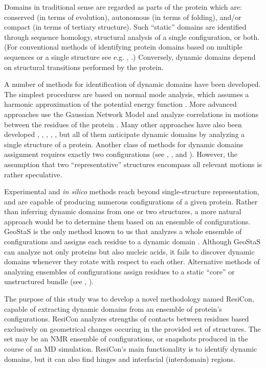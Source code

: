 Domains in traditional sense are regarded as parts of the protein which are: conserved (in terms of evolution), autonomous (in terms of folding), and/or compact (in terms of tertiary structure).
Such ``static'' domains are identified through sequence homology, structural analysis of a single configuration, or both.
(For conventional methods of identifying protein domains based on multiple sequences or a single structure see e.g. \cite{richardson1981anatomy}, \cite{bork1991shuffled}.)
Conversely, dynamic domains depend on structural transitions performed by the protein.

A number of methods for identification of dynamic domains have been developed.
The simplest procedures are based on normal mode analysis, which assumes a harmonic approximation of the potential energy function \cite{hinsen1998analysis}.
More advanced approaches use the Gaussian Network Model and analyze correlations in motions between the residues of the protein \cite{yesylevskyy2006dynamic}.
Many other approaches have also been developed \cite{bahar1997direct}, \cite{wriggers1997protein}, \cite{bernhard2010optimal}, \cite{genoni2012identification}, \cite{potestio2009coarse}, but all of them anticipate dynamic domains by analyzing a single structure of a protein.
Another class of methods for dynamic domains assignment requires exactly two configurations (see \cite{hayward1998systematic}, \cite{lee2003dyndom}, and \cite{ye2003flexible}).
However, the assumption that two ``representative'' structures encompass all relevant motions is rather speculative.

Experimental and \emph{in silico} methods reach beyond single-structure representation, and are capable of producing numerous configurations of a given protein.
Rather than inferring dynamic domains from one or two structures, a more natural approach would be to determine them based on an ensemble of configurations.
GeoStaS is the only method known to us that analyzes a whole ensemble of configurations and assigns each residue to a dynamic domain \cite{romanowska2012determining}.
Although GeoStaS can analyze not only proteins but also nucleic acids, it fails to discover dynamic domains whenever they rotate with respect to each other.
Alternative methods of analyzing ensembles of configurations assign residues to a static ``core'' or unstructured bundle (see \cite{snyder2005clustering}, \cite{kirchner2011objective}).

The purpose of this study was to develop a novel methodology named ResiCon, capable of extracting dynamic domains from an ensemble of protein's configurations.
ResiCon analyzes strengths of contacts between residues based exclusively on geometrical changes occuring in the provided set of structures.
The set may be an NMR ensemble of configurations, or snapshots produced in the course of an MD simulation.
ResiCon's main functionality is to identify dynamic domains, but it can also find hinges and interfacial (interdomain) regions.


